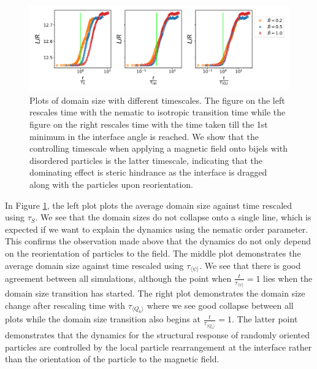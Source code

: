 \begin{figure} 
    \centering 
    \includegraphics[width=\columnwidth]{../figures/results/paper2/domain_size-field_on-scaled.png} 
    \caption{Plots of domain size with different timescales. The figure on the left rescales time with the nematic to 
            isotropic transition time while the figure on the right rescales time with the time taken till the 1st minimum in 
            the interface angle is reached. We show that the controlling timescale when applying a magnetic field onto bijels 
            with disordered particles is the latter timescale, indicating that the dominating effect is steric hindrance as the 
            interface is dragged along with the particles upon reorientation.} 
    \label{fig:domain_size-field_on-scaled} 
\end{figure}

In Figure \ref{fig:domain_size-field_on-scaled}, the left plot plots the average domain size against time rescaled 
using $\tau_S$. We see that the domain sizes do not collapse onto a single line, which is expected if we want to 
explain the dynamics using the nematic order parameter. This confirms the observation made above that the dynamics 
do not only depend on the reorientation of particles to the field. The middle plot demonstrates the average domain 
size against time rescaled using $\tau_{\langle \psi \rangle}$. We see that there is good agreement between all 
simulations, although the point when $\frac{t}{\tau_{\langle \psi \rangle}} = 1$ lies when the domain size transition 
has started. The right plot demonstrates the domain size change after rescaling time with $\tau_{\langle Q_6 \rangle}$ 
where we see good collapse between all plots while the domain size transition also begins at 
$\frac{t}{\tau_{\langle Q_6 \rangle}} = 1$. The latter point demonstrates that the dynamics for the 
structural response of randomly oriented particles are controlled by the local particle rearrangement at the 
interface rather than the orientation of the particle to the magnetic field.

